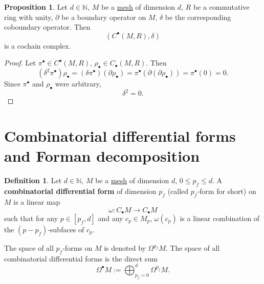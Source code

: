 \documentclass[fleqn]{article}
\theoremstyle{definition}
\newtheorem{proposition}[theorem]{Proposition}
\newtheorem{definition}[theorem]{Definition}
\newcommand{\N}{\mathbb{N}}
\begin{document}
\begin{proposition}
  Let
    $d \in \N$,
    $M$ be a \hyperref[idec:mesh:definition]{mesh} of dimension $d$,
    $R$ be a commutative ring with unity,
    $\partial$ be a boundary operator on $M$,
    $\delta$ be the corresponding coboundary operator.
  Then
  \begin{equation}
    (C^\bullet(M, R), \delta)
  \end{equation}
  is a cochain complex.
\end{proposition}

\begin{proof}
  Let $\pi^\bullet \in C^\bullet(M, R)$, $\rho_\bullet \in C_\bullet(M, R)$.
  Then
  \begin{equation}
    (\delta^2 \pi^\bullet) \rho_\bullet
    = (\delta \pi^\bullet) (\partial \rho_\bullet)
    = \pi^\bullet (\partial (\partial \rho_\bullet))
    = \pi^\bullet (0)
    = 0.
  \end{equation}
  Since $\pi^\bullet$ and $\rho_\bullet$ were arbitrary,
  \begin{equation}
    \delta^2 = 0.
  \end{equation}
\end{proof}

\section{Combinatorial differential forms and Forman decomposition}

\begin{definition}
  Let
    $d \in \N$,
    $M$ be a \hyperref[idec:mesh:definition]{mesh} of dimension $d$,
    $0 \leq p_f \leq d$.
  A \textbf{combinatorial differential form} of dimension $p_f$
  (called $p_f$-form for short) on $M$ is a linear map
  \begin{equation}
    \omega \colon C_\bullet M \to C_\bullet M
  \end{equation}
  such that for any $p \in [p_f, d]$ and any $c_p \in M_p$,
  $\omega(c_p)$ is a linear combination of the $(p - p_f)$-subfaces of $c_p$.

  The space of all $p_f$-forms on $M$ is denoted by $\Omega^{p_f} M$.
  The space of all combinatorial differential forms is the direct sum
  \begin{equation}
    \Omega^\bullet M := \bigoplus_{p_f = 0}^{d} \Omega^{p_f} M.
  \end{equation}
\end{definition}
\end{document}
